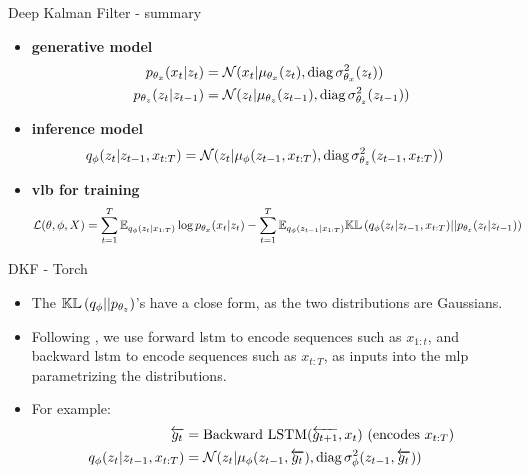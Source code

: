 \begin{frame}{Deep Kalman Filter - summary}
\begin{tcolorbox}[colback=blue!5!white,colframe=black!75!black,title=Deep Kalman Filter]
\begin{itemize}
    \item \textbf{generative model}
    \begin{align}
        \label{gen_model_dkf}
        p_{\theta_x}(x_t \vert z_t) &= \mathcal{N}( x_t \vert \mu_{\theta_x}(z_t), \text{diag}\, \sigma_{\theta_x}^2(z_t))\\
        p_{\theta_z}(z_t \vert z_{t-1}) &= \mathcal{N}( z_t \vert \mu_{\theta_z}(z_{t-1}), \text{diag}\, \sigma_{\theta_z}^2(z_{t-1}))
    \end{align}
    \item \textbf{inference model}
    \begin{align}
        \label{inf_model_dkf}
        q_{\phi}(z_t \vert z_{t-1}, x_{t:T}) &= \mathcal{N}( z_t \vert \mu_{\phi}(z_{t-1}, x_{t:T}), \text{diag}\, \sigma_{\theta_z}^2(z_{t-1},x_{t:T}))
    \end{align}
    \item \textbf{\gls{vlb} for training}
    \begin{align}
        \label{vlb_dkf}
        \mathcal{L}(\theta, \phi, X) &= \sum_{t=1}^T \mathbb{E}_{q_\phi(z_{t} \vert x_{1:T})} \log{p_{\theta_x}(x_t \vert z_t)} - \sum_{t=1}^T \mathbb{E}_{q_\phi(z_{t-1} \vert x_{1:T})} \mathbb{KL}\left( q_{\phi}(z_t \vert z_{t-1}, x_{t:T}) \vert\vert p_{\theta_z}(z_t \vert z_{t-1}) \right)
    \end{align}
\end{itemize}
\end{tcolorbox}
\end{frame}

\begin{frame}{DKF - Torch}
    \begin{itemize}
        \item The $\mathbb{KL}\left( q_\phi \vert\vert p_{\theta_z} \right)$'s have a close form, as the two distributions are Gaussians. %

        \item Following \cite{girin_dynamical_2022}, we use forward \gls{lstm} to encode sequences such as $x_{1:t}$, and backward \gls{lstm} to encode sequences such as $x_{t:T}$, as inputs into the \gls{mlp} parametrizing the distributions. 
        \item For example:
            \begin{align*}
                \overleftarrow{g_t} &= \text{Backward LSTM}(\overleftarrow{g_{t+1}}, x_t) \,\, (\text{encodes} \,\, x_{t:T}) \\
                q_{\phi}(z_t \vert z_{t-1}, x_{t:T}) &= \mathcal{N}( z_t \vert \mu_{\phi}(z_{t-1}, \overleftarrow{g_t}), \text{diag}\, \sigma_{\phi}^2(z_{t-1}, \overleftarrow{g_t}))
            \end{align*}
    \end{itemize}
\end{frame}


